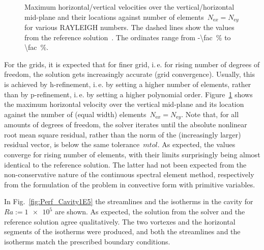 \documentclass[10pt, ngerman, english,
twoside, open=right,
numbers=noenddot,
declaration=section,
abstract=section,
abstract=multiple,
abstract=notoc,
declaration=notoc,
cd=pale, 
chapterprefix=off, 
chapterpage=false, 
headingsvskip=-10em,
cdgeometry=custom, 
slantedgreek=on,
cdmath=on, 
cdfont=on,
ttfont=false,
mathswap=off,
]{tudscrreprt}
\numberwithin{equation}{chapter}
\renewcommand{\textsc}[1]{\uppercase{\mbox{#1}}}
\newcommand{\sidenote}[1]{
  \leavevmode %
  \marginpar{\hyphenpenalty=1000 \flushleft{\textcolor{HKS41}{#1}}}}
\begin{document}
\begin{figure}[!b]
\centering

\caption{Maximum horizontal/vertical velocities over the vertical/horizontal mid-plane and their locations against number of elements~$N_{\text{e}x}=N_{\text{e}y}$ for various \textsc{Rayleigh} numbers. The dashed lines show the values from the reference solution~\cite[Tab.~V]{DeVahl}. The ordinates range from \SI{-\fac}{\percent} to \SI{\fac}{\percent}.}\label{fig:Perf_verifyN}
\end{figure}
\sidenote{Accuracy}For the grids, it is expected that for finer grid, i.\,e. for rising number of degrees of freedom, the solution gets increasingly accurate (grid convergence). Usually, this is achieved by h-refinement, i.\,e. by setting a higher number of elements, rather than by p-refinement, i.\,e. by setting a higher polynomial order.
Figure~\ref{fig:Perf_verifyN} shows the maximum horizontal velocity over the vertical mid-plane and its location against the number of (equal width) elements~$N_{\text{e}x}=N_{\text{e}y}$.
Note that, for all amounts of degrees of freedom, the solver iterates until the absolute nonlinear root mean square residual, rather than the norm of the (increasingly larger) residual vector, is below the same tolerance~$mtol$.
As expected, the values converge for rising number of elements, with their limits surprisingly being almost identical to the reference solution. The latter had not been expected from the non-conservative nature of the continuous spectral element method, respectively from the formulation of the problem in convective form with primitive variables.\par
\sidenote{Qualitatively}In Fig.~\ref{fig:Perf_Cavity1E5} the streamlines and the isotherms in the cavity for~$Ra:=\num{1e5}$ are shown. As expected, the solution from the solver and the reference solution agree qualitatively. The two vortexes and the horizontal segments of the isotherms were produced, and both the streamlines and the isotherms match the prescribed boundary conditions.\par
\end{document}
